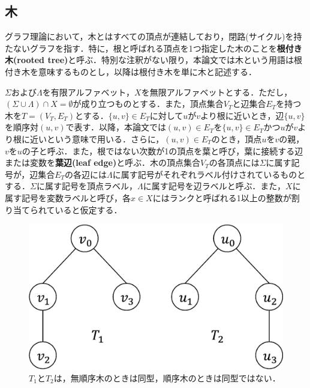 \subsection{木}
グラフ理論において，木とはすべての頂点が連結しており，閉路(サイクル)を持たないグラフを指す．特に，根と呼ばれる頂点を1つ指定した木のことを\textbf{根付き木(rooted tree)}と呼ぶ．特別な注釈がない限り，本論文では木という用語は根付き木を意味するものとし，以降は根付き木を単に木と記述する．

$\Sigma$および$\Lambda$を有限アルファベット，$X$を無限アルファベットとする．ただし，$(\Sigma\cup\Lambda)\cap X=\emptyset$が成り立つものとする．また，頂点集合$V_T$と辺集合$E_T$を持つ木を$T = (V_T, E_T)$とする．$\{u,v\}\in E_T$に対して$u$が$v$より根に近いとき，辺$\{u,v\}$を順序対$(u,v)$で表す．以降，本論文では$(u,v)\in E_T$を$\{u,v\}\in E_T$かつ$u$が$v$より根に近いという意味で用いる．さらに，$(u,v)\in E_T$のとき，頂点$u$を$v$の親，$v$を$u$の子と呼ぶ．また，根ではない次数が1の頂点を葉と呼び，葉に接続する辺または変数を\textbf{葉辺(leaf edge)}と呼ぶ．木の頂点集合$V_T$の各頂点には$\Sigma$に属す記号が，辺集合$E_T$の各辺には$\Lambda$に属す記号がそれぞれラベル付けされているものとする．$\Sigma$に属す記号を頂点ラベル，$\Lambda$に属す記号を辺ラベルと呼ぶ．また，$X$に属す記号を変数ラベルと呼び，各$x \in X$にはランクと呼ばれる1以上の整数が割り当てられていると仮定する．

\begin{figure}[tb]
  \centering
  \includegraphics[scale=0.28]{fig/fig-sibling_relationship.eps}
  \caption{$T_1$と$T_2$は，無順序木のときは同型，順序木のときは同型ではない．}\label{fig:sibling_relationship}
\end{figure}

